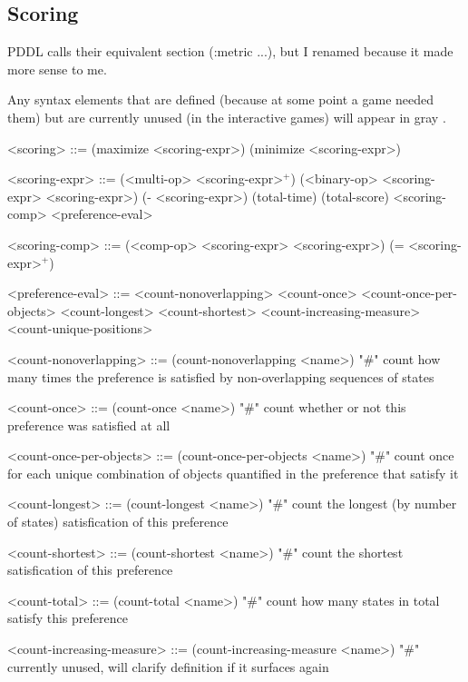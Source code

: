 \documentclass{article}
\begin{document}
\subsection{Scoring}
PDDL calls their equivalent section (:metric ...), but I renamed because it made more sense to me. 

        Any syntax elements that are defined (because at some point a game needed them) but are currently unused (in the interactive games) will appear in { \color{gray} gray }.
        
\begin{grammar}
<scoring> ::= (maximize <scoring-expr>) \alt (minimize <scoring-expr>)

<scoring-expr> ::= (<multi-op> <scoring-expr>$^+$) \alt
        (<binary-op> <scoring-expr> <scoring-expr>) \alt
        (- <scoring-expr>) \alt
        (total-time) \alt
        (total-score) \alt
        <scoring-comp> \alt
        <preference-eval> 
        
    

<scoring-comp> ::=  (<comp-op> <scoring-expr> <scoring-expr>) \alt
        (= <scoring-expr>$^+$)
    

<preference-eval> ::=  <count-nonoverlapping> \alt
        <count-once> \alt
        <count-once-per-objects> \alt
        <count-longest> \alt
        <count-shortest> \alt
        <count-increasing-measure> \alt
        <count-unique-positions>
    

<count-nonoverlapping> ::= (count-nonoverlapping <name>) "#" count how many times the preference is satisfied by non-overlapping sequences of states 

<count-once> ::= (count-once <name>) "#" count whether or not this preference was satisfied at all

<count-once-per-objects> ::= (count-once-per-objects <name>) "#" count once for each unique combination of objects quantified in the preference that satisfy it

{ \color{gray} <count-longest> ::= (count-longest <name>) "#" count the longest (by number of states) satisfication of this preference }

{ \color{gray} <count-shortest> ::= (count-shortest <name>) "#" count the shortest satisfication of this preference  }

{ \color{gray} <count-total> ::= (count-total <name>) "#" count how many states in total satisfy this preference }

{ \color{gray} <count-increasing-measure> ::= (count-increasing-measure <name>) "#" currently unused, will clarify definition if it surfaces again }


\end{grammar}
\end{document}
